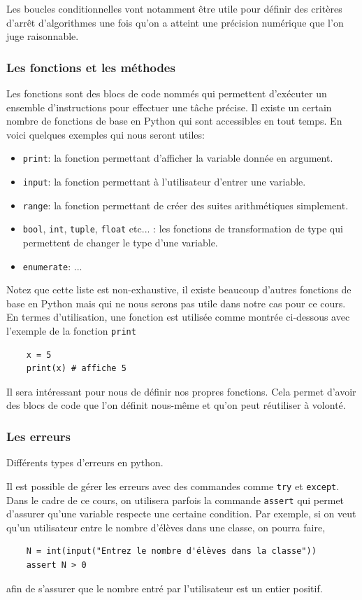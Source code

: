 \documentclass[titlepage]{article}
\theoremstyle{cleanremark}
\begin{document}
\noindent Les boucles conditionnelles vont notamment être utile pour définir des critères d'arrêt d'algorithmes une fois qu'on a atteint une précision numérique que l'on juge raisonnable. 

\subsubsection{Les fonctions et les méthodes}

Les fonctions sont des blocs de code nommés qui permettent d'exécuter un ensemble d'instructions pour effectuer une tâche précise. 
Il existe un certain nombre de fonctions de base en Python qui sont accessibles en tout temps. 
En voici quelques exemples qui nous seront utiles:
\begin{itemize}
    \item \texttt{print}: la fonction permettant d'afficher la variable donnée en argument. 
    \item \texttt{input}: la fonction permettant à l'utilisateur d'entrer une variable.
    \item \texttt{range}: la fonction permettant de créer des suites arithmétiques simplement.
    \item \texttt{bool}, \texttt{int}, \texttt{tuple}, \texttt{float} etc... : les fonctions de transformation de type qui permettent de changer le type d'une variable.
    \item \texttt{enumerate}: ... 
\end{itemize}
Notez que cette liste est non-exhaustive, il existe beaucoup d'autres fonctions de base en Python mais qui ne nous serons pas utile dans notre cas pour ce cours.
En termes d'utilisation, une fonction est utilisée comme montrée ci-dessous avec l'exemple de la fonction \texttt{print}
\begin{verbatim}
    x = 5
    print(x) # affiche 5
\end{verbatim}
Il sera intéressant pour nous de définir nos propres fonctions. Cela permet d'avoir 
des blocs de code que l'on définit nous-même et qu'on peut réutiliser à volonté. 


\subsubsection{Les erreurs}
Différents types d'erreurs en python. 

Il est possible de gérer les erreurs avec des commandes comme \texttt{try} et \texttt{except}. 
Dans le cadre de ce cours, on utilisera parfois la commande \texttt{assert} qui permet d'assurer qu'une variable respecte une certaine condition.
Par exemple, si on veut qu'un utilisateur entre le nombre d'élèves dans une classe, on pourra faire, 
\begin{verbatim}
    N = int(input("Entrez le nombre d'élèves dans la classe"))
    assert N > 0
\end{verbatim}
afin de s'assurer que le nombre entré par l'utilisateur est un entier positif. 
\end{document}
